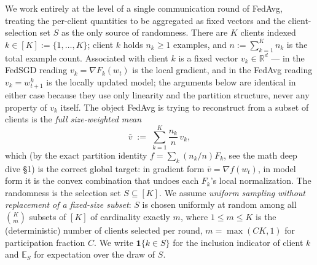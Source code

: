 \documentclass[11pt]{article}
\theoremstyle{definition}
\theoremstyle{remark}
\begin{document}
We work entirely at the level of a single communication round of FedAvg, treating the per-client quantities to be aggregated as fixed vectors and the client-selection set $S$ as the only source of randomness. There are $K$ clients indexed $k\in[K]:=\{1,\dots,K\}$; client $k$ holds $n_k\ge 1$ examples, and $n:=\sum_{k=1}^{K}n_k$ is the total example count. Associated with client $k$ is a fixed vector $v_k\in\mathbb{R}^d$ --- in the FedSGD reading $v_k=\nabla F_k(w_t)$ is the local gradient, and in the FedAvg reading $v_k=w^{k}_{t+1}$ is the locally updated model; the arguments below are identical in either case because they use only linearity and the partition structure, never any property of $v_k$ itself. The object FedAvg is trying to reconstruct from a subset of clients is the \emph{full size-weighted mean}
\[
\bar v \;:=\; \sum_{k=1}^{K}\frac{n_k}{n}\,v_k,
\]
which (by the exact partition identity $f=\sum_k (n_k/n)F_k$, see the math deep dive \S 1) is the correct global target: in gradient form $\bar v=\nabla f(w_t)$, in model form it is the convex combination that undoes each $F_k$'s local normalization. The randomness is the selection set $S\subseteq[K]$. We assume \emph{uniform sampling without replacement of a fixed-size subset}: $S$ is chosen uniformly at random among all $\binom{K}{m}$ subsets of $[K]$ of cardinality exactly $m$, where $1\le m\le K$ is the (deterministic) number of clients selected per round, $m=\max(CK,1)$ for participation fraction $C$. We write $\mathbf 1\{k\in S\}$ for the inclusion indicator of client $k$ and $\mathbb{E}_S$ for expectation over the draw of $S$.
\end{document}
